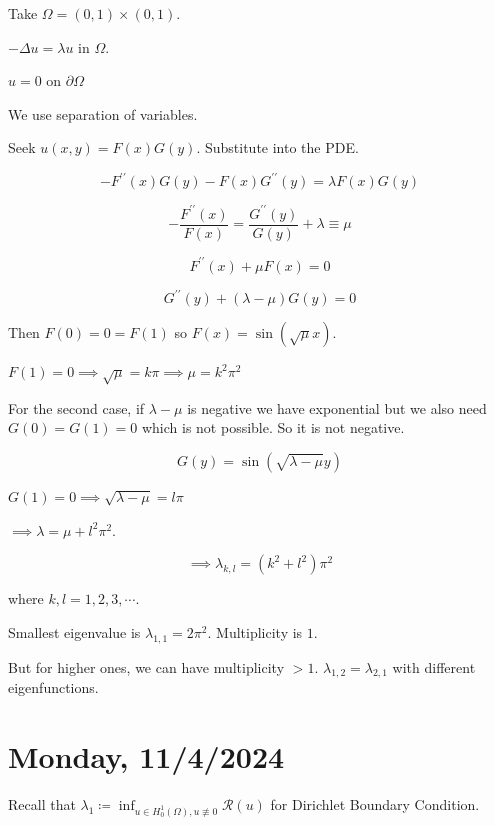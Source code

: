 \documentclass{article}
\theoremstyle{definition}
\begin{document}
Take \(\Omega = (0,1) \times (0,1)\).

\begin{center}
\end{center}

\(- \Delta u = \lambda u \) in \(\Omega\).

\(u = 0\) on \(\partial \Omega\) 

We use separation of variables.

Seek \(u(x,y) = F(x)G(y)\). Substitute into the PDE.

\[
    - F^{\prime\prime} (x) G(y) - F(x) G^{\prime\prime}(y) = \lambda F(x) G(y)
\]

\[
    -\frac{F^{\prime\prime}(x)}{F(x)} = \frac{G^{\prime\prime}(y)}{G(y)} + \lambda \equiv \mu
\]

\[
    F^{\prime\prime} (x) + \mu F(x) = 0
\]

\[
    G^{\prime\prime}(y) + (\lambda - \mu)G(y) = 0
\]

Then \(F(0)=0=F(1)\) so \(F(x) = \sin(\sqrt{\mu} x)\).

\(F(1) = 0 \implies \sqrt{\mu} = k \pi \implies \mu = k^2 \pi ^2\) 

For the second case, if \(\lambda - \mu\) is negative we have exponential but we also need \(G(0)=G(1)=0\) which is not possible. So it is not negative.

\[
    G(y) = \sin(\sqrt{\lambda - \mu}y)
\]

\(G(1) = 0\implies \sqrt{\lambda - \mu} = l \pi\)

\(\implies \lambda = \mu + l^2 \pi^2\).

\[
    \implies \lambda_{k,l} = (k^2 + l^2) \pi^2
\]

where \(k,l = 1,2,3,\cdots\).

Smallest eigenvalue is \(\lambda_{1,1} = 2\pi^2\). Multiplicity is \(1\).

But for higher ones, we can have multiplicity \(>1\). \(\lambda_{1,2} = \lambda_{2,1}\) with different eigenfunctions.

\section*{Monday, 11/4/2024}

Recall that \(\lambda_1 \coloneqq \inf_{u \in H^1_0(\Omega), u\not\equiv 0} \mathcal{R} (u)\) for Dirichlet Boundary Condition.
\end{document}

